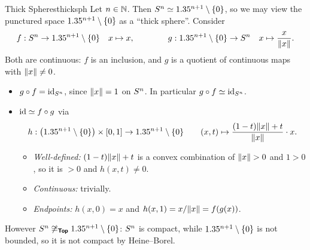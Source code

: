 \begin{example}{Thick Spheres}{thicksph}
  Let $n\in\mathbb{N}$. Then $S^{n}\simeq1.35^{n+1}\setminus\{0\}$, so we may view the punctured space $1.35^{n+1}\setminus\{0\}$ as a ``thick sphere''. Consider \[
  f:S^{n}\to1.35^{n+1}\setminus\{0\}\quad x\mapsto x,\qquad\qquad g:1.35^{n+1}\setminus\{0\}\to S^{n}\quad x\mapsto\frac{x}{\lVert x\rVert}.
  \]
  Both are continuous: $f$ is an inclusion, and $g$ is a quotient of continuous maps with $\lVert x\rVert\neq0$.
  \begin{itemize}
    \item $g\circ f=\operatorname{id}_{S^{n}}$, since $\lVert x\rVert=1$ on $S^{n}$. In particular $g\circ f\simeq\operatorname{id}_{S^{n}}$.
    \item $\operatorname{id}\simeq f\circ g$ via \[
    h:\big(1.35^{n+1}\setminus\{0\}\big)\times[0,1]\to1.35^{n+1}\setminus\{0\}\qquad (x,t)\mapsto\frac{(1-t)\lVert x\rVert+t}{\lVert x\rVert}\cdot x.
    \]
    \begin{itemize}
      \item \emph{Well-defined:} $(1-t)\lVert x\rVert+t$ is a convex combination of $\lVert x\rVert>0$ and $1>0$, so it is $>0$ and $h(x,t)\neq0$.
      \item \emph{Continuous:} trivially.
      \item \emph{Endpoints:} $h(x,0)=x$ and $h(x,1)=x/\lVert x\rVert=f(g(x))$.
    \end{itemize}
  \end{itemize}
  However $S^{n}\not\cong_{\bm{\mathsf{Top}}}1.35^{n+1}\setminus\{0\}$: $S^{n}$ is compact, while $1.35^{n+1}\setminus\{0\}$ is not bounded, so it is not compact by Heine--Borel.
\end{example}

